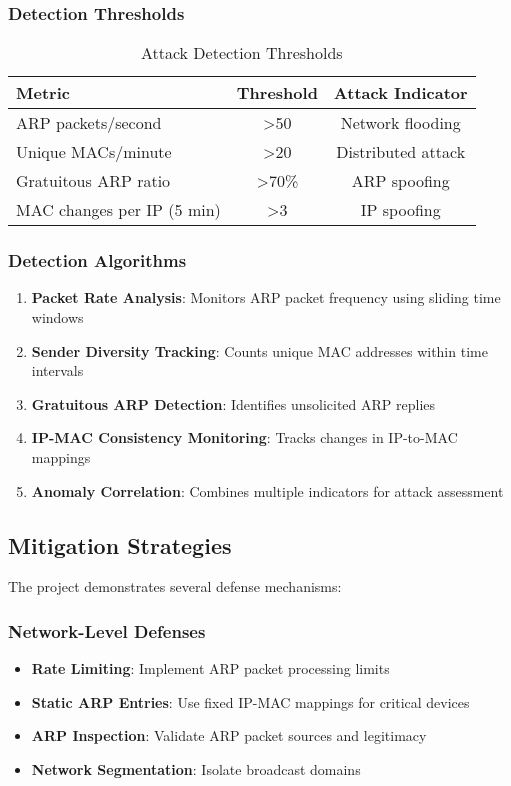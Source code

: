 \documentclass[12pt,a4paper]{article}
\begin{document}
\subsubsection{Detection Thresholds}
\begin{table}[H]
\centering
\caption{Attack Detection Thresholds}
\begin{tabular}{|l|c|c|}
\hline
\textbf{Metric} & \textbf{Threshold} & \textbf{Attack Indicator} \\
\hline
ARP packets/second & >50 & Network flooding \\
\hline
Unique MACs/minute & >20 & Distributed attack \\
\hline
Gratuitous ARP ratio & >70\% & ARP spoofing \\
\hline
MAC changes per IP (5 min) & >3 & IP spoofing \\
\hline
\end{tabular}
\end{table}

\subsubsection{Detection Algorithms}
\begin{enumerate}
    \item \textbf{Packet Rate Analysis}: Monitors ARP packet frequency using sliding time windows
    \item \textbf{Sender Diversity Tracking}: Counts unique MAC addresses within time intervals
    \item \textbf{Gratuitous ARP Detection}: Identifies unsolicited ARP replies
    \item \textbf{IP-MAC Consistency Monitoring}: Tracks changes in IP-to-MAC mappings
    \item \textbf{Anomaly Correlation}: Combines multiple indicators for attack assessment
\end{enumerate}

\subsection{Mitigation Strategies}

The project demonstrates several defense mechanisms:

\subsubsection{Network-Level Defenses}
\begin{itemize}
    \item \textbf{Rate Limiting}: Implement ARP packet processing limits
    \item \textbf{Static ARP Entries}: Use fixed IP-MAC mappings for critical devices
    \item \textbf{ARP Inspection}: Validate ARP packet sources and legitimacy
    \item \textbf{Network Segmentation}: Isolate broadcast domains
\end{itemize}
\end{document}
